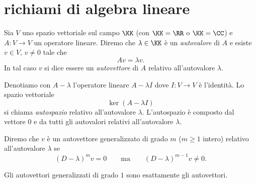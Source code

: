 \chapter{richiami di algebra lineare}

\begin{definition}
Sia $V$ uno spazio vettoriale sul campo $\KK$ (con $\KK = \RR$ o $\KK=\CC$)
e $A\colon V\to V$ un operatore lineare.
Diremo che $\lambda\in \KK$ è un \emph{autovalore}%
 di $A$
e esiste $v\in V$, $v\neq 0$ tale che
\[
  Av = \lambda v.
\]
In tal caso $v$ si dice essere un \emph{autovettore}%
 di $A$ relativo
all'autovalore $\lambda$.

Denotiamo con $A-\lambda$ l'operatore lineare $A-\lambda I$
dove $I\colon V\to V$ è l'identità.
Lo spazio vettoriale
\[
  \ker (A-\lambda I)
\]
si chiama \emph{autospazio}%
 relativo all'autovalore $\lambda$.
L'autospazio è composto dal vettore $0$ e da tutti gli autovalori
relativi all'autovalore $\lambda$.

Diremo che $v$ è un autovettore generalizzato di grado $m$ ($m\ge 1$ intero)
relativo all'autovalore $\lambda$
se
\[
 (D-\lambda)^m v = 0
 \qquad \text{ma} \qquad
  (D-\lambda)^{m-1} v \neq 0.
\]

Gli autovettori generalizzati di grado $1$ sono esattamente gli
autovettori.
\end{definition}


